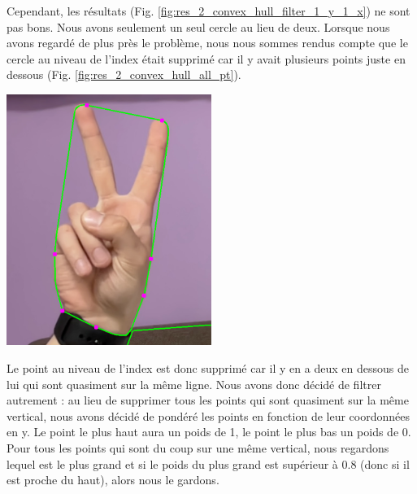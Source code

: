 \documentclass[11pt]{article}
\begin{document}
Cependant, les résultats (Fig. \ref{fig:res_2_convex_hull_filter_1_y_1_x}) ne sont pas bons. Nous avons seulement un seul cercle au lieu de deux. Lorsque nous avons regardé de plus près le problème, nous nous sommes rendus compte que le cercle au niveau de l'index était supprimé car il y avait plusieurs points juste en dessous (Fig. \ref{fig:res_2_convex_hull_all_pt}).  \bigbreak

\begin{center}
    \includegraphics[width=0.5\textwidth]{images/res_2_convex_hull_all_pt.png}
    \label{fig:res_2_convex_hull_all_pt}
\end{center}

Le point au niveau de l'index est donc supprimé car il y en a deux en dessous de lui qui sont quasiment sur la même ligne. Nous avons donc décidé de filtrer autrement : au lieu de supprimer tous les points qui sont quasiment sur la même vertical, nous avons décidé de pondéré les points en fonction de leur coordonnées en y. Le point le plus haut aura un poids de 1, le point le plus bas un poids de 0. Pour tous les points qui sont du coup sur une même vertical, nous regardons lequel est le plus grand et si le poids du plus grand est supérieur à 0.8 (donc si il est proche du haut), alors nous le gardons. \bigbreak
\end{document}
